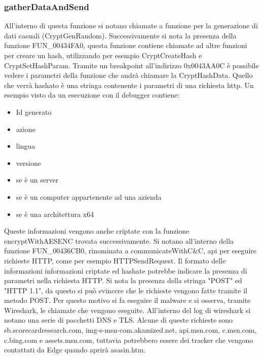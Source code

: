 \documentclass[a4paper,12pt]{article}
\begin{document}
\subsubsection{gatherDataAndSend}
All'interno di questa funzione si notano chiamate a funzione per la generazione di dati casuali (CryptGenRandom). Successivamente si nota la presenza della funzione FUN\_00434FA0, questa funzione contiene chiamate ad altre funzioni per creare un hash, utilizzando per esempio CryptCreateHash e CryptSetHashParam. Tramite un breakpoint all'indirizzo 0x0043AA0C è possibile vedere i parametri della funzione che andrà chiamare la CryptHashData. Quello che verrà hashato è una stringa contenente i parametri di una richiesta http. Un esempio visto da un esecuzione con il debugger contiene:
\begin{itemize}
	\item Id generato
	\item azione
	\item lingua
	\item versione
	\item se è un server
	\item se è un computer appartenente ad una azienda
	\item se è una architettura x64
\end{itemize}

Queste informazioni vengono anche criptate con la funzione encryptWithAESENC trovata successivamente.
Si notano all'interno della funzione FUN\_00436CB0, rinominata a communicateWithC\&C, api per eseguire richieste HTTP, come per esempio HTTPSendRequest. Il formato delle informazioni informazioni criptate ed hashate potrebbe indicare la presenza di parametri nella richiesta HTTP. Si nota la presenza della stringa "POST" ed "HTTP 1.1", da questo si può evincere che le richieste vengono fatte tramite il metodo POST.
Per questo motivo si fa eseguire il malware e si osserva, tramite Wireshark, le chiamate che vengono eseguite. All'interno del log di wireshark si notano una serie di pacchetti DNS e TLS.  Alcune di queste richieste sono sb.scorecardresearch.com, img-s-msn-com.akamized.net, api.msn.com, c.msn.com, c.bing.com e assets.msn.com, tuttavia potrebbero essere dei tracker che vengono contattati da Edge quando aprirà asasin.htm. 
\end{document}
